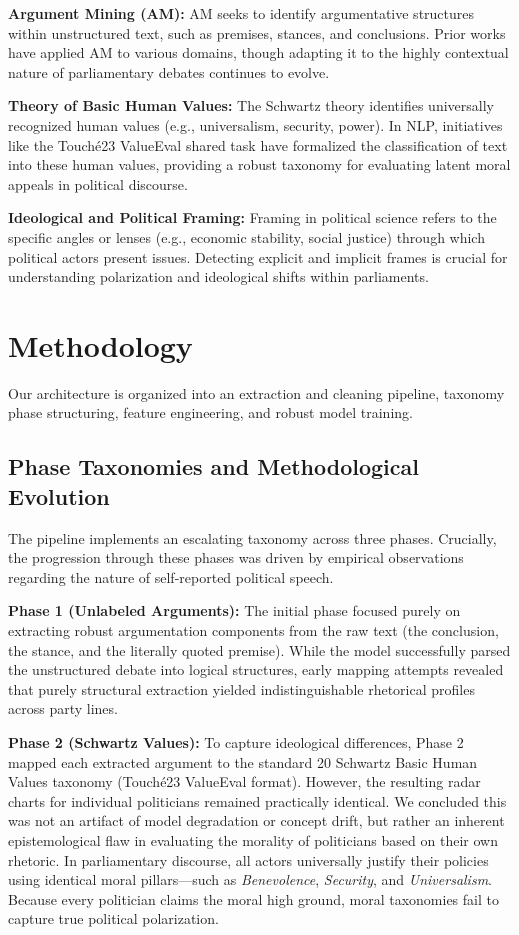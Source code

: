 \documentclass[11pt,a4paper]{article}
\begin{document}
\textbf{Argument Mining (AM):} AM seeks to identify argumentative structures within unstructured text, such as premises, stances, and conclusions. Prior works have applied AM to various domains, though adapting it to the highly contextual nature of parliamentary debates continues to evolve. 

\textbf{Theory of Basic Human Values:} The Schwartz theory identifies universally recognized human values (e.g., universalism, security, power). In NLP, initiatives like the Touché23 ValueEval shared task have formalized the classification of text into these human values, providing a robust taxonomy for evaluating latent moral appeals in political discourse.

\textbf{Ideological and Political Framing:} Framing in political science refers to the specific angles or lenses (e.g., economic stability, social justice) through which political actors present issues. Detecting explicit and implicit frames is crucial for understanding polarization and ideological shifts within parliaments.

\section{Methodology}
Our architecture is organized into an extraction and cleaning pipeline, taxonomy phase structuring, feature engineering, and robust model training.

\subsection{Phase Taxonomies and Methodological Evolution}
The pipeline implements an escalating taxonomy across three phases. Crucially, the progression through these phases was driven by empirical observations regarding the nature of self-reported political speech.

\textbf{Phase 1 (Unlabeled Arguments):} The initial phase focused purely on extracting robust argumentation components from the raw text (the conclusion, the stance, and the literally quoted premise). While the model successfully parsed the unstructured debate into logical structures, early mapping attempts revealed that purely structural extraction yielded indistinguishable rhetorical profiles across party lines.

\textbf{Phase 2 (Schwartz Values):} To capture ideological differences, Phase 2 mapped each extracted argument to the standard 20 Schwartz Basic Human Values taxonomy (Touché23 ValueEval format). However, the resulting radar charts for individual politicians remained practically identical. We concluded this was not an artifact of model degradation or concept drift, but rather an inherent epistemological flaw in evaluating the morality of politicians based on their own rhetoric. In parliamentary discourse, all actors universally justify their policies using identical moral pillars—such as \textit{Benevolence}, \textit{Security}, and \textit{Universalism}. Because every politician claims the moral high ground, moral taxonomies fail to capture true political polarization.
\end{document}
